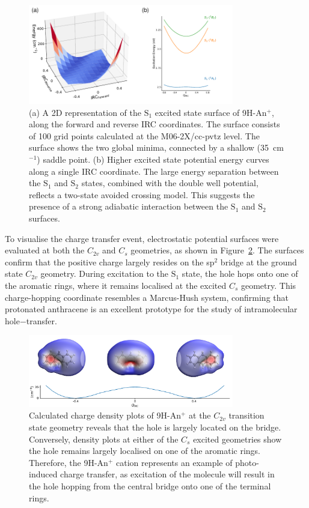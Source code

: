 \documentclass[journal=jpcafh,manuscript=article,layout=onecolumn, 12pt]{achemso}
\begin{document}
\begin{figure} [h]
	\includegraphics[width=0.8\textwidth]{figures/Figure2}
	\caption{(a) A 2D representation of the $\text{S}_1$ excited state surface of 9H-An$^+$, along the forward and reverse IRC coordinates. The surface consists of 100 grid points calculated at the M06-2X/cc-pvtz level. The surface shows the two global minima, connected by a shallow (35~cm$^{-1}$) saddle point. (b) Higher excited state potential energy curves along a single IRC coordinate. The large energy separation between the $\text{S}_1$ and $\text{S}_2$ states, combined with the double well potential, reflects a two-state avoided crossing model. This suggests the presence of a strong adiabatic interaction between the $\text{S}_1$ and $\text{S}_2$ surfaces. }
	\label{Fig:2}
\end{figure}

To visualise the charge transfer event, electrostatic potential surfaces were evaluated at both the $C_{2v}$ and $C_s$ geometries, as shown in Figure~\ref{Fig:3}. The surfaces confirm that the positive charge largely resides on the sp$^{2}$ bridge at the ground state $C_{2v}$ geometry. During excitation to the $\text{S}_1$ state, the hole hops onto one of the aromatic rings, where it remains localised at the excited $C_s$ geometry. This charge-hopping coordinate resembles a Marcus-Hush system, confirming that protonated anthracene is an excellent prototype for the study of intramolecular hole$-$transfer.

\begin{figure} [h]
	\includegraphics[width=0.8\textwidth]{figures/Figure3W}
	\caption{Calculated charge density plots of 9H-An$^+$ at the $C_{2v}$ transition state geometry reveals that the hole is largely located on the bridge. Conversely, density plots at either of the $C_s$ excited geometries show the hole remains largely localised on one of the aromatic rings. Therefore, the 9H-An$^+$ cation represents an example of photo-induced charge transfer, as excitation of the molecule will result in the hole hopping from the central bridge onto one of the terminal rings.}
	\label{Fig:3}
\end{figure}
\end{document}
